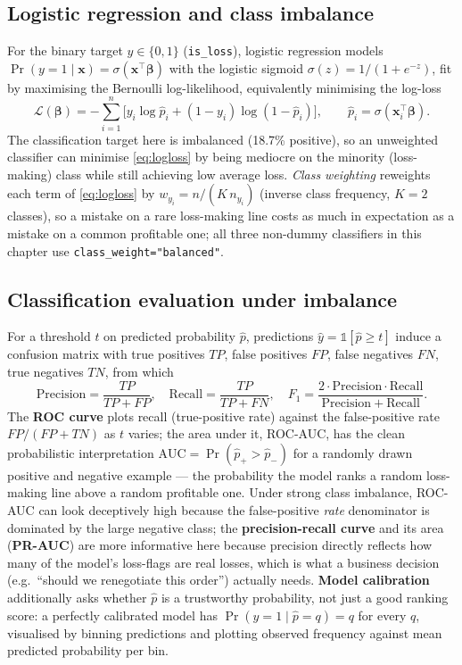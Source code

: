 \subsection{Logistic regression and class imbalance}
For the binary target $y\in\{0,1\}$ (\texttt{is\_loss}), logistic
regression models $\Pr(y=1\mid\mathbf x) = \sigma(\mathbf
x^\top\boldsymbol\beta)$ with the logistic sigmoid
$\sigma(z)=1/(1+e^{-z})$, fit by maximising the Bernoulli log-likelihood,
equivalently minimising the log-loss
\begin{equation}
  \mathcal L(\boldsymbol\beta) = -\sum_{i=1}^n
    \bigl[y_i \log \hat p_i + (1-y_i)\log(1-\hat p_i)\bigr],
  \qquad \hat p_i = \sigma(\mathbf x_i^\top\boldsymbol\beta).
  \label{eq:logloss}
\end{equation}
The classification target here is imbalanced (18.7\% positive), so an
unweighted classifier can minimise \cref{eq:logloss} by being mediocre
on the minority (loss-making) class while still achieving low average
loss. \emph{Class weighting} reweights each term of
\cref{eq:logloss} by $w_{y_i} = n / (K\, n_{y_i})$ (inverse class
frequency, $K=2$ classes), so a mistake on a rare loss-making line costs
as much in expectation as a mistake on a common profitable one; all three
non-dummy classifiers in this chapter use \texttt{class\_weight="balanced"}.

\subsection{Classification evaluation under imbalance}
For a threshold $t$ on predicted probability $\hat p$, predictions
$\hat y = \mathbb 1[\hat p \geq t]$ induce a confusion matrix with true
positives $TP$, false positives $FP$, false negatives $FN$, true
negatives $TN$, from which
\begin{equation}
  \mathrm{Precision} = \frac{TP}{TP+FP}, \quad
  \mathrm{Recall} = \frac{TP}{TP+FN}, \quad
  F_1 = \frac{2\cdot\mathrm{Precision}\cdot\mathrm{Recall}}{\mathrm{Precision}+\mathrm{Recall}}.
  \label{eq:prf1}
\end{equation}
The \textbf{ROC curve} plots recall (true-positive rate) against the
false-positive rate $FP/(FP+TN)$ as $t$ varies; the area under it, ROC-AUC,
has the clean probabilistic interpretation
$\mathrm{AUC} = \Pr(\hat p_{+} > \hat p_{-})$ for a randomly drawn
positive and negative example — the probability the model ranks a random
loss-making line above a random profitable one. Under strong class
imbalance, ROC-AUC can look deceptively high because the false-positive
\emph{rate} denominator is dominated by the large negative class; the
\textbf{precision-recall curve} and its area (\textbf{PR-AUC}) are more
informative here because precision directly reflects how many of the
model's loss-flags are real losses, which is what a business decision
(e.g.\ ``should we renegotiate this order'') actually needs. \textbf{Model
calibration} additionally asks whether $\hat p$ is a trustworthy
probability, not just a good ranking score: a perfectly calibrated model
has $\Pr(y=1 \mid \hat p = q) = q$ for every $q$, visualised by binning
predictions and plotting observed frequency against mean predicted
probability per bin.

